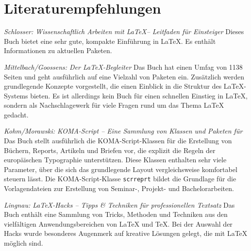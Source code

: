 \chapter{Literaturempfehlungen}

\begin{seList}
\item \textsl{Schlosser: Wissenschaftlich Arbeiten mit \LaTeX -- Leitfaden f\"ur Einsteiger}\newline
Dieses Buch bietet eine sehr gute, kompakte Einf\"uhrung in \LaTeX. Es enth\"alt Informationen zu 
aktuellen Paketen. 
\item \textsl{Mittelbach/Goossens: Der LaTeX-Begleiter}\newline
Das Buch hat einen Umfag von 1138 Seiten und geht ausf\"uhrlich auf eine Vielzahl von Paketen ein. 
Zus\"atzlich werden grundlegende Konzepte vorgestellt, die einen Einblick in die Struktur des \LaTeX-Systems bieten.
Es ist allerdings kein Buch f\"ur einen schnellen Einstieg in \LaTeX, sondern als Nachschlagewerk f\"ur viele Fragen 
rund um das Thema \LaTeX{} gedacht.
\item \textsl{Kohm/Morawski: KOMA-Script -- Eine Sammlung von Klassen und Paketen f\"ur \LaTeXe}\newline
Das Buch stellt ausf\"uhrlich die KOMA-Script-Klassen f\"ur die Erstellung von B\"uchern, Reports, Artikeln und Briefen vor, 
die explizit die Regeln der europ\"aischen Typographie unterst\"utzen. Diese Klassen enthalten sehr viele Parameter, \"uber die 
sich das grundlegende Layout vergleichsweise komfortabel steuern l\"asst. Die KOMA-Script-Klasse \texttt{scrreprt} bildet die 
Grundlage f\"ur die Vorlagendateien zur Erstellung von Seminar-, Projekt- und Bachelorarbeiten.
\item \textsl{Lingnau: \LaTeX-Hacks -- Tipps \& Techniken f\"ur professionellen Textsatz}\newline
Das Buch enth\"alt eine Sammlung von Tricks, Methoden und Techniken aus den vielf\"altigen Anwendungsbereichen von 
\LaTeX{} und \TeX. Bei der Auswahl der Hacks wurde besonderes Augenmerk auf kreative L\"osungen gelegt, die mit 
\LaTeX{} m\"oglich sind.
\end{seList}